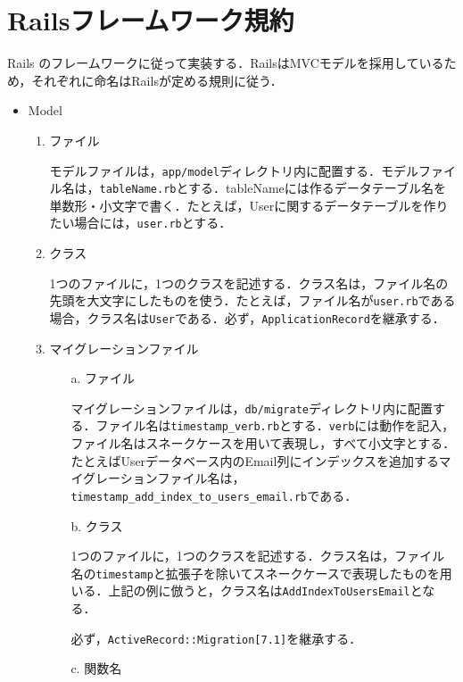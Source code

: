\newpage

\section{Railsフレームワーク規約}\label{q3.2}
Rails のフレームワークに従って実装する．RailsはMVCモデルを採用しているため，それぞれに命名はRailsが定める規則に従う．
\begin{itemize}
	\item Model
	      \begin{enumerate}
		      \item ファイル

		            モデルファイルは，\texttt{app/model}ディレクトリ内に配置する．モデルファイル名は，\texttt{tableName.rb}とする．{{tableName}}には作るデータテーブル名を単数形・小文字で書く．たとえば，Userに関するデータテーブルを作りたい場合には，\texttt{user.rb}とする．

		      \item クラス

		            1つのファイルに，1つのクラスを記述する．クラス名は，ファイル名の先頭を大文字にしたものを使う．たとえば，ファイル名が\texttt{user.rb}である場合，クラス名は\texttt{User}である．必ず，\texttt{ApplicationRecord}を継承する．

		      \item マイグレーションファイル
		            \begin{enumerate}
			            \item[a.] ファイル

				            マイグレーションファイルは，\texttt{db/migrate}ディレクトリ内に配置する．ファイル名は\texttt{timestamp\_verb.rb}とする．\texttt{verb}には動作を記入，ファイル名はスネークケースを用いて表現し，すべて小文字とする．たとえばUserデータベース内のEmail列にインデックスを追加するマイグレーションファイル名は，\texttt{timestamp\_add\_index\_to\_users\_email.rb}である．
			            \item[b.] クラス

				            1つのファイルに，1つのクラスを記述する．クラス名は，ファイル名の\texttt{timestamp}と拡張子を除いてスネークケースで表現したものを用いる．上記の例に倣うと，クラス名は\texttt{AddIndexToUsersEmail}となる．

				            必ず，\texttt{ActiveRecord::Migration[7.1]}を継承する．

			            \item[c.] 関数名


\end{enumerate}
\end{enumerate}
\end{itemize}
